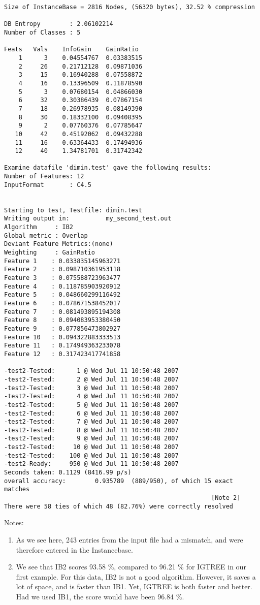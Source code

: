 \documentclass{report}
\begin{document}
\begin{footnotesize}
\begin{verbatim}
Size of InstanceBase = 2816 Nodes, (56320 bytes), 32.52 % compression

DB Entropy        : 2.06102214
Number of Classes : 5

Feats	Vals	InfoGain	GainRatio
    1      3	0.04554767	0.03383515
    2     26	0.21712128	0.09871036
    3     15	0.16940288	0.07558872
    4     16	0.13396509	0.11878590
    5      3	0.07680154	0.04866030
    6     32	0.30386439	0.07867154
    7     18	0.26978935	0.08149390
    8     30	0.18332100	0.09408395
    9      2	0.07760376	0.07785647
   10     42	0.45192062	0.09432288
   11     16	0.63364433	0.17494936
   12     40	1.34781701	0.31742342

Examine datafile 'dimin.test' gave the following results:
Number of Features: 12
InputFormat       : C4.5


Starting to test, Testfile: dimin.test
Writing output in:          my_second_test.out
Algorithm     : IB2
Global metric : Overlap
Deviant Feature Metrics:(none)
Weighting     : GainRatio
Feature 1	 : 0.033835145963271
Feature 2	 : 0.098710361953118
Feature 3	 : 0.075588723963477
Feature 4	 : 0.118785903920912
Feature 5	 : 0.048660299116492
Feature 6	 : 0.078671538452017
Feature 7	 : 0.081493895194308
Feature 8	 : 0.094083953380450
Feature 9	 : 0.077856473802927
Feature 10	 : 0.094322883333513
Feature 11	 : 0.174949363233078
Feature 12	 : 0.317423417741858

-test2-Tested:      1 @ Wed Jul 11 10:50:48 2007
-test2-Tested:      2 @ Wed Jul 11 10:50:48 2007
-test2-Tested:      3 @ Wed Jul 11 10:50:48 2007
-test2-Tested:      4 @ Wed Jul 11 10:50:48 2007
-test2-Tested:      5 @ Wed Jul 11 10:50:48 2007
-test2-Tested:      6 @ Wed Jul 11 10:50:48 2007
-test2-Tested:      7 @ Wed Jul 11 10:50:48 2007
-test2-Tested:      8 @ Wed Jul 11 10:50:48 2007
-test2-Tested:      9 @ Wed Jul 11 10:50:48 2007
-test2-Tested:     10 @ Wed Jul 11 10:50:48 2007
-test2-Tested:    100 @ Wed Jul 11 10:50:48 2007
-test2-Ready:     950 @ Wed Jul 11 10:50:48 2007
Seconds taken: 0.1129 (8416.99 p/s)
overall accuracy:        0.935789  (889/950), of which 15 exact matches 
                                                         [Note 2]
There were 58 ties of which 48 (82.76%) were correctly resolved
\end{verbatim}
\end{footnotesize}


Notes:
\begin{enumerate}
\item As we see here, 243 entries from the input file had a mismatch,
and were therefore entered in the Instancebase.
\item We see that IB2 scores 93.58 \%, compared to 96.21 \% for IGTREE
  in our first example.  For this data, IB2 is not a good
  algorithm. However, it saves a lot of space, and is faster than
  IB1. Yet, IGTREE is both faster and better. Had we used IB1, the
  score would have been 96.84 \%.
\end{enumerate}
\clearpage
\end{document}
